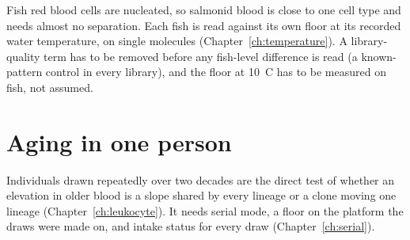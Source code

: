 Fish red blood cells are nucleated, so salmonid blood is close to one cell type and needs almost no separation. Each fish is read against its own floor at its recorded water temperature, on single molecules (Chapter~\ref{ch:temperature}). A
library-quality term has to be removed before any fish-level difference is read (a known-pattern control in every library), and the floor at 10~\textdegree C has to be measured on fish, not assumed. \openprob

\section{Aging in one person}

Individuals drawn repeatedly over two decades are the direct test of whether an elevation in older blood is a slope shared by every lineage or a clone moving one lineage
(Chapter~\ref{ch:leukocyte}). It needs serial mode, a floor on the platform the draws were made on, and intake status for every draw (Chapter~\ref{ch:serial}). \openprob
